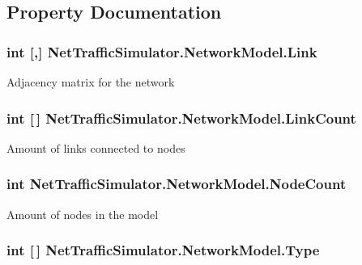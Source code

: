 \subsection{Property Documentation}
\hypertarget{classNetTrafficSimulator_1_1NetworkModel_a80ab4cd62faf7b08759fc997f342c207}{
\subsubsection[{Link}]{\setlength{\rightskip}{0pt plus 5cm}int \mbox{[},\mbox{]} Net\-Traffic\-Simulator.\-Network\-Model.\-Link\hspace{0.3cm}{\ttfamily [get]}}}\label{classNetTrafficSimulator_1_1NetworkModel_a80ab4cd62faf7b08759fc997f342c207}
Adjacency matrix for the network \hypertarget{classNetTrafficSimulator_1_1NetworkModel_ad5eb61d192908f46907fd7f91f796691}{
\subsubsection[{Link\-Count}]{\setlength{\rightskip}{0pt plus 5cm}int \mbox{[}$\,$\mbox{]} Net\-Traffic\-Simulator.\-Network\-Model.\-Link\-Count\hspace{0.3cm}{\ttfamily [get]}}}\label{classNetTrafficSimulator_1_1NetworkModel_ad5eb61d192908f46907fd7f91f796691}
Amount of links connected to nodes \hypertarget{classNetTrafficSimulator_1_1NetworkModel_ae999583acaea839a7611f610bed2fed6}{
\subsubsection[{Node\-Count}]{\setlength{\rightskip}{0pt plus 5cm}int Net\-Traffic\-Simulator.\-Network\-Model.\-Node\-Count\hspace{0.3cm}{\ttfamily [get]}}}\label{classNetTrafficSimulator_1_1NetworkModel_ae999583acaea839a7611f610bed2fed6}
Amount of nodes in the model \hypertarget{classNetTrafficSimulator_1_1NetworkModel_a92df1a7e9c05637930eae22d788f7c18}{
\subsubsection[{Type}]{\setlength{\rightskip}{0pt plus 5cm}int \mbox{[}$\,$\mbox{]} Net\-Traffic\-Simulator.\-Network\-Model.\-Type\hspace{0.3cm}{\ttfamily [get]}}}\label{classNetTrafficSimulator_1_1NetworkModel_a92df1a7e9c05637930eae22d788f7c18}
